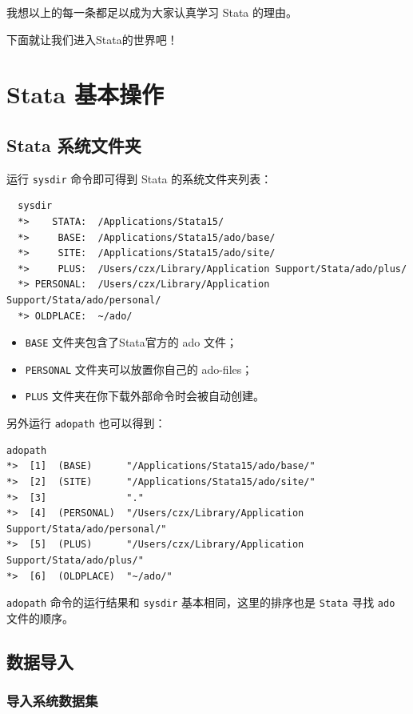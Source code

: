 \documentclass[cn,fancy,blue,11pt]{elegantbook}
\begin{document}
我想以上的每一条都足以成为大家认真学习 Stata 的理由。

下面就让我们进入Stata的世界吧！

\section{Stata 基本操作}
\subsection{Stata 系统文件夹}

运行 \lstinline{sysdir} 命令即可得到 Stata 的系统文件夹列表：

\begin{lstlisting}
  sysdir
  *>    STATA:  /Applications/Stata15/
  *>     BASE:  /Applications/Stata15/ado/base/
  *>     SITE:  /Applications/Stata15/ado/site/
  *>     PLUS:  /Users/czx/Library/Application Support/Stata/ado/plus/
  *> PERSONAL:  /Users/czx/Library/Application Support/Stata/ado/personal/
  *> OLDPLACE:  ~/ado/
\end{lstlisting}

\begin{itemize}
  \item  \texttt{BASE} 文件夹包含了Stata官方的 ado 文件；
  \item  \texttt{PERSONAL} 文件夹可以放置你自己的 ado-files；
  \item  \texttt{PLUS} 文件夹在你下载外部命令时会被自动创建。
\end{itemize}

另外运行 \texttt{adopath} 也可以得到：

\begin{lstlisting}
adopath
*>  [1]  (BASE)      "/Applications/Stata15/ado/base/"
*>  [2]  (SITE)      "/Applications/Stata15/ado/site/"
*>  [3]              "."
*>  [4]  (PERSONAL)  "/Users/czx/Library/Application Support/Stata/ado/personal/"
*>  [5]  (PLUS)      "/Users/czx/Library/Application Support/Stata/ado/plus/"
*>  [6]  (OLDPLACE)  "~/ado/"
\end{lstlisting}

\texttt{adopath} 命令的运行结果和 \texttt{sysdir} 基本相同，这里的排序也是 \texttt{Stata} 寻找 \texttt{ado} 文件的顺序。

\subsection{数据导入}
\subsubsection{导入系统数据集}
\end{document}
